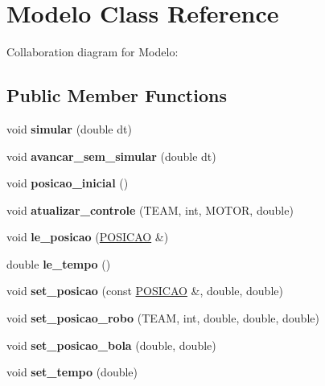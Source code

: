 \hypertarget{classModelo}{}\section{Modelo Class Reference}
\label{classModelo}


Collaboration diagram for Modelo\+:
\subsection*{Public Member Functions}
\begin{DoxyCompactItemize}
\item 
void {\bfseries simular} (double dt)\hypertarget{classModelo_a46df07422c7e2f71c6addcb4db543215}{}\label{classModelo_a46df07422c7e2f71c6addcb4db543215}

\item 
void {\bfseries avancar\+\_\+sem\+\_\+simular} (double dt)\hypertarget{classModelo_a1246915be40eb03d13267a04625a5a25}{}\label{classModelo_a1246915be40eb03d13267a04625a5a25}

\item 
void {\bfseries posicao\+\_\+inicial} ()\hypertarget{classModelo_a05130d35121313c380136f7a27e7f749}{}\label{classModelo_a05130d35121313c380136f7a27e7f749}

\item 
void {\bfseries atualizar\+\_\+controle} (T\+E\+AM, int, M\+O\+T\+OR, double)\hypertarget{classModelo_afda0d872ccc8c78b6fb8530427344469}{}\label{classModelo_afda0d872ccc8c78b6fb8530427344469}

\item 
void {\bfseries le\+\_\+posicao} (\hyperlink{structPOSICAO}{P\+O\+S\+I\+C\+AO} \&)\hypertarget{classModelo_a0f711dbf1eb1552a81bcd2726ac47a7c}{}\label{classModelo_a0f711dbf1eb1552a81bcd2726ac47a7c}

\item 
double {\bfseries le\+\_\+tempo} ()\hypertarget{classModelo_a97ccaef7e82bed14f32460deb8fb4a36}{}\label{classModelo_a97ccaef7e82bed14f32460deb8fb4a36}

\item 
void {\bfseries set\+\_\+posicao} (const \hyperlink{structPOSICAO}{P\+O\+S\+I\+C\+AO} \&, double, double)\hypertarget{classModelo_ab00485f32cc524958f7a3870d776e44a}{}\label{classModelo_ab00485f32cc524958f7a3870d776e44a}

\item 
void {\bfseries set\+\_\+posicao\+\_\+robo} (T\+E\+AM, int, double, double, double)\hypertarget{classModelo_a08244536d72e7cc2a08d650f3d969df0}{}\label{classModelo_a08244536d72e7cc2a08d650f3d969df0}

\item 
void {\bfseries set\+\_\+posicao\+\_\+bola} (double, double)\hypertarget{classModelo_a3bffbf2e10d8fd07e323f6b6986b0192}{}\label{classModelo_a3bffbf2e10d8fd07e323f6b6986b0192}

\item 
void {\bfseries set\+\_\+tempo} (double)\hypertarget{classModelo_a04fc18937d8e89f782cf10893e32863a}{}\label{classModelo_a04fc18937d8e89f782cf10893e32863a}

\end{DoxyCompactItemize}
